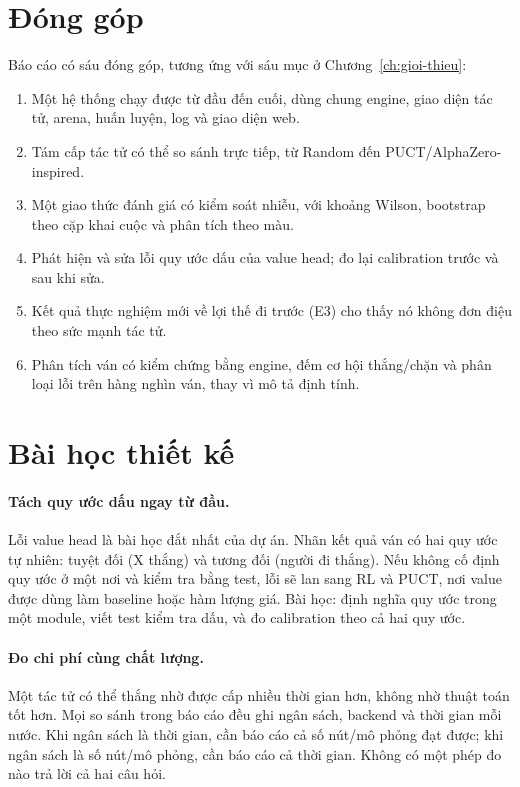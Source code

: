 \section{Đóng góp}
\label{sec:kl-dong-gop}
Báo cáo có sáu đóng góp, tương ứng với sáu mục ở Chương~\ref{ch:gioi-thieu}:
\begin{enumerate}
  \item Một hệ thống chạy được từ đầu đến cuối, dùng chung engine, giao diện tác tử, arena,
        huấn luyện, log và giao diện web.
  \item Tám cấp tác tử có thể so sánh trực tiếp, từ Random đến PUCT/AlphaZero-inspired.
  \item Một giao thức đánh giá có kiểm soát nhiễu, với khoảng Wilson, bootstrap theo cặp khai
        cuộc và phân tích theo màu.
  \item Phát hiện và sửa lỗi quy ước dấu của value head; đo lại calibration trước và sau khi
        sửa.
  \item Kết quả thực nghiệm mới về lợi thế đi trước (E3) cho thấy nó không đơn điệu theo sức
        mạnh tác tử.
  \item Phân tích ván có kiểm chứng bằng engine, đếm cơ hội thắng/chặn và phân loại lỗi trên
        hàng nghìn ván, thay vì mô tả định tính.
\end{enumerate}

\section{Bài học thiết kế}
\label{sec:kl-bai-hoc}
\paragraph{Tách quy ước dấu ngay từ đầu.} Lỗi value head là bài học đắt nhất của dự án. Nhãn
kết quả ván có hai quy ước tự nhiên: tuyệt đối (X thắng) và tương đối (người đi thắng). Nếu
không cố định quy ước ở một nơi và kiểm tra bằng test, lỗi sẽ lan sang RL và PUCT, nơi value
được dùng làm baseline hoặc hàm lượng giá. Bài học: định nghĩa quy ước trong một module, viết
test kiểm tra dấu, và đo calibration theo cả hai quy ước.

\paragraph{Đo chi phí cùng chất lượng.} Một tác tử có thể thắng nhờ được cấp nhiều thời gian
hơn, không nhờ thuật toán tốt hơn. Mọi so sánh trong báo cáo đều ghi ngân sách, backend và
thời gian mỗi nước. Khi ngân sách là thời gian, cần báo cáo cả số nút/mô phỏng đạt được; khi
ngân sách là số nút/mô phỏng, cần báo cáo cả thời gian. Không có một phép đo nào trả lời cả hai
câu hỏi.

